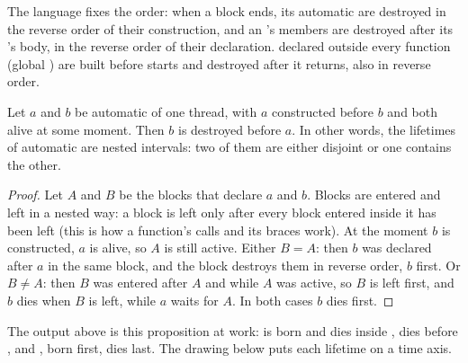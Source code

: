 \label{lst:b2:cpp-classes-raii:lifetimes}

\label{out:b2:cpp-classes-raii:lifetimes}

The language fixes the order: when a block ends, its automatic  are destroyed in the reverse order of their
construction, and an 's members are destroyed after its 's body, in the reverse order of their
declaration.
 declared outside every function (global ) are built before  starts and destroyed after
it returns, also in reverse order.

\begin{proposition}\label{prop:b2:cpp-classes-raii:reverse-order}
Let $a$ and $b$ be automatic  of one thread, with $a$ constructed before $b$ and both alive at some moment.
Then $b$ is destroyed before $a$. In other words, the lifetimes of automatic  are nested intervals: two of
them are either disjoint or one contains the other.
\end{proposition}

\begin{proof}
Let $A$ and $B$ be the blocks that declare $a$ and $b$. Blocks are entered and left in a nested way: a block is left
only after every block entered inside it has been left (this is how a function's calls and its braces work). At
the moment $b$ is constructed, $a$ is alive, so $A$ is still active. Either $B = A$: then $b$ was declared after $a$
in the same block, and the block destroys them in reverse order, $b$ first. Or $B \neq A$: then $B$ was entered
after $A$ and while $A$ was active, so $B$ is left first, and $b$ dies when $B$ is left, while $a$ waits for $A$.
In both cases $b$ dies first.
\end{proof}

The output above is this proposition at work:  is born and dies inside ,  dies before
, and , born first, dies last. The drawing below puts each lifetime on a time axis.

